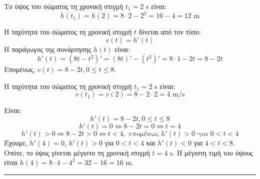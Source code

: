 
\begin{alist}
    \item Το ύψος του σώματος τη χρονική στιγμή $t_1 = 2$ s είναι:
    \[
        h(t_1) = h(2) = 8 \cdot 2 - 2^2 = 16 - 4 = 12 \text{ m}
    \]

    \item Η ταχύτητα του σώματος τη χρονική στιγμή $t$ δίνεται από τον τύπο:
    \[
        v(t) = h'(t)
    \]
    Η παράγωγος της συνάρτησης $h(t)$ είναι:
    \[
        h'(t) = (8t - t^2)' = (8t)' - (t^2)' = 8 \cdot 1 - 2t = 8 - 2t
    \]
    Επομένως, $v(t) = 8 - 2t, 0 \le t \le 8$.

    \item Η ταχύτητα του σώματος τη χρονική στιγμή $t_1 = 2$ s είναι:
    \[
        v(t_1) = v(2) = 8 - 2 \cdot 2 = 4 \text{ m/s}
    \]

    \item Είναι:
    \[
        h'(t) = 8 - 2t, 0 \le t \le 8
    \]
    \[
        h'(t) = 0 \Leftrightarrow 8 - 2t = 0 \Leftrightarrow t = 4
    \]
    \[
        h'(t) > 0 \Leftrightarrow 8 - 2t > 0 \Leftrightarrow t < 4, \text{ επομένως } h'(t) > 0 \text{ για } 0 < t < 4
    \]
    Έχουμε, $h'(4) = 0$, $h'(t) > 0$ για $0 < t < 4$ και $h'(t) < 0$ για $4 < t < 8$. Οπότε, το ύψος γίνεται μέγιστο τη χρονική στιγμή $t=4$ s.
    Η μέγιστη τιμή του ύψους είναι $h(4) = 8 \cdot 4 - 4^2 = 32 - 16 = 16$ m.
\end{alist}
\vspace{6mm}
\noindent\rule{\textwidth}{0.4pt}
\vspace{6mm}

